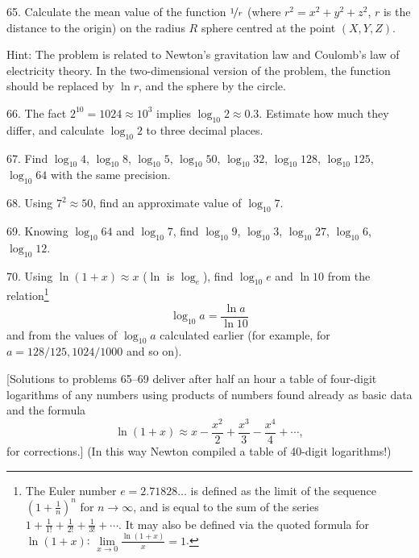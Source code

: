 \begin{problem}{65.}
Calculate the mean value of the function  $\nicefrac{1}{r}$ (where
$r^2=x^2+y^2+z^2$, $r$ is the distance to the origin) on the radius
$R$ sphere centred at the point $(X,Y,Z)$.

\begin{note}{Hint:}
	The problem is related to Newton's gravitation law and Coulomb's law of electricity theory.
	In the two-dimensional version of the problem, the function should be replaced by $\ln r$, and the sphere by the circle.
\end{note}
\end{problem}

\begin{problem}{66.}
The fact $2^{10}=1024 \approx 10^3$ implies
$\log_{10} 2 \approx 0.3$. 	Estimate how much they differ, and calculate $\log_{10} 2$ to three decimal places.
\end{problem}

\begin{problem}{67.}
Find $\log_{10} 4$, $\log_{10} 8$,
$\log_{10} 5$, $\log_{10} 50$, $\log_{10} 32$, $\log_{10} 128$,
$\log_{10} 125$, $\log_{10} 64$ with the same precision.
\end{problem}

\begin{problem}{68.}
Using $7^2 \approx 50$, find an approximate value of $\log_{10} 7$.
\end{problem}

\begin{problem}{69.}
Knowing $\log_{10} 64$ and $\log_{10} 7$, find $\log_{10} 9$, $\log_{10} 3$,
$\log_{10} 27$, $\log_{10} 6$, $\log_{10} 12$.
\end{problem}

\begin{problem}{70.}
Using $\ln (1+x) \approx x$ ($\ln$ is $\log_e$), find $\log_{10} e$ and
$\ln 10$ from the relation\footnote{The Euler number $e = 2{.}71828\dots$ is defined as the limit of the sequence
	$\left(1+\frac{1}{n}\right)^n$ for $n\to \infty$, and is equal to the sum of the series
	$1+\frac{1}{1!} +\frac{1}{2!}+\frac{1}{3!}+\dotsb$. It may also be defined via the quoted formula for
	$\ln (1+x)$: $\lim\limits_{x\to 0}\frac{\ln(1+x)}{x} = 1$.}
%
\begin{equation*}
	\log_{10} a=\frac{\ln a}{\ln 10}
\end{equation*}
and from the values of $\log_{10} a$ calculated earlier (for example, for $a=128/125, 1024/1000$
and so on).

	[Solutions to problems 65--69 deliver after half an hour a table of four-digit logarithms of any numbers using
		products of numbers found already as basic data and the formula
		\begin{equation*}
			\ln (1+x) \approx x-\frac{x^2}{2}+\frac{x^3}{3}-\frac{x^4}{4}+\dotsb,
		\end{equation*}
		for corrections.] (In this way Newton compiled a table of
40-digit logarithms!)
\end{problem}


